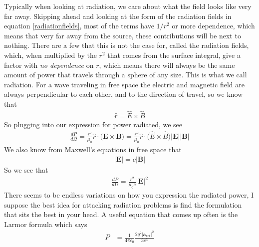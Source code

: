 Typically when looking at radiation, we care about what the field looks like very far away. Skipping ahead and looking at the form of the radiation fields in equation \ref{radiationfields}, most of the terms have $1/r^2$ or more dependence, which means that very far away from the source, these contributions will be next to nothing. There are a few that this is not the case for, called the radiation fields, which, when multiplied by the $r^2$ that comes from the surface integral, give a factor with \emph{no dependence} on $r$, which means there will always be the same amount of power that travels through a sphere of any size. This is what we call radiation. For a wave traveling in free space the electric and magnetic field are always perpendicular to each other, and to the direction of travel, so we know that 
\begin{align}
    \hat{r} = \hat{E}\times\hat{B}
\end{align}
So plugging into our expression for power radiated, we see
\begin{align}
    \frac{dP}{d\Omega} = \frac{r^2}{\mu_0} \hat{r}\cdot\Big(\textbf{E}\times\textbf{B}\Big) = \frac{r^2}{\mu_0}\hat{r}\cdot\Big(\hat{E}\times\hat{B}\Big)|\textbf{E}||\textbf{B}|
\end{align}
We also know from Maxwell's equations in free space that
\begin{align}
    |\textbf{E}| = c|\textbf{B}|
\end{align}
So we see that
\begin{align}
    \frac{dP}{d\Omega} = \frac{r^2}{\mu_0c} |\textbf{E}|^2
\end{align}
There seems to be endless variations on how you expression the radiated power, I suppose the best idea for attacking radiation problems is find the formulation that sits the best in your head. A useful equation that comes up often is the Larmor formula which says
 \begin{align}
 P &=\frac{1}{4\pi\epsilon_0}\frac{2q^2|\textbf{a}_{ret}|^2}{3c^3}
 \end{align}
 
 

